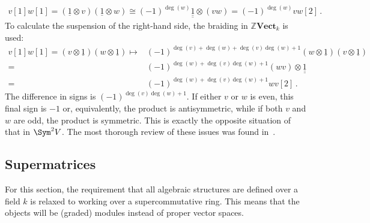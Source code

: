 \begin{remark}
\begin{gather}
            v[1]w[1]=(\underline{1}\otimes v)(\underline{1}\otimes w) \cong (-1)^{\deg(w)}\underline{\underline{1}}\otimes(vw)=(-1)^{\deg(w)}vw[2]\,.
        \end{gather}
        To calculate the suspension of the right-hand side, the braiding in $\mathbb{Z}\mathbf{Vect}_k$ is used:
        \begin{align*}
            v[1]w[1]=(v\otimes\underline{1})(w\otimes\underline{1})\mapsto&(-1)^{\deg(v)+\deg(w)+\deg(v)\deg(w)+1}(w\otimes\underline{1})(v\otimes\underline{1})\\
            =&(-1)^{\deg(w)+\deg(v)\deg(w)+1}(wv)\otimes\underline{\underline{1}}\\
            =&(-1)^{\deg(w)+\deg(v)\deg(w)+1}wv[2]\,.
        \end{align*}
        The difference in signs is $(-1)^{\deg(v)\deg(w)+1}$. If either $v$ or $w$ is even, this final sign is $-1$ or, equivalently, the product is antisymmetric, while if both $v$ and $w$ are odd, the product is symmetric. This is exactly the opposite situation of that in $\Sym^2V$. The most thorough review of these issues was found in~\citet{miti_homotopy_2021}.
    \end{remark}

\subsection{Supermatrices}

    For this section, the requirement that all algebraic structures are defined over a field $k$ is relaxed to working over a supercommutative ring. This means that the objects will be (graded) modules instead of proper vector spaces.

